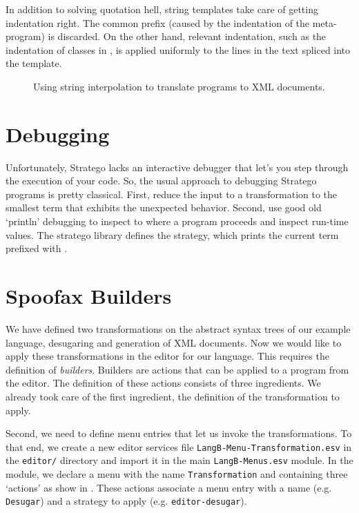 In addition to solving quotation hell, string templates take care of getting
indentation right. The common prefix (caused by the indentation of the
meta-program) is discarded. On the other hand, relevant indentation, such
as the indentation of classes in , is applied uniformly to
the lines in the text spliced into the template.

\begin{figure}[t]

\caption{Using string interpolation to translate programs to XML documents.}
\end{figure}


\section{Debugging}

Unfortunately, Stratego lacks an interactive debugger that let's you step
through the execution of your code. So, the usual approach to debugging Stratego
programs is pretty classical. First, reduce the input to a transformation to the
smallest term that exhibits the unexpected behavior. Second, use good old
`println' debugging to inspect to where a program proceeds and inspect run-time
values. The stratego library defines the  strategy, which
prints the current term prefixed with .

\section{Spoofax Builders}

We have defined two transformations on the abstract syntax trees of our example
language, desugaring and generation of XML documents.
Now we would like to apply these transformations in the editor for our language. 
This requires the definition of \emph{builders}. 
Builders are actions that can be applied to a program from the editor. 
The definition of these actions consists of three ingredients. 
We already took care of the first ingredient, the definition of the
transformation to apply.

Second, we need to define menu entries that let us invoke the transformations.
To that end, we create a new editor services file
\texttt{LangB-Menu-Transformation.esv} in the \texttt{editor/} directory and
import it in the main \texttt{LangB-Menus.esv} module.
In the module, we declare a menu with the name \texttt{Transformation} and
containing three `actions' as show in .
These actions associate a menu entry with a name (e.g. \texttt{Desugar}) and a
strategy to apply (e.g. \texttt{editor-desugar}).

